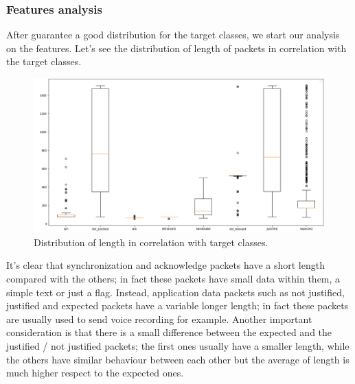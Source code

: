 \documentclass[sigconf]{acmart}
\begin{document}
	\subsubsection{Features analysis}
	After guarantee a good distribution for the target classes, we start our analysis on the features. Let's see the distribution of length of packets in correlation with the target classes.
	\begin{figure}[h!]
            \includegraphics[width=0.8\linewidth]{img/length_distribution.png}
            \caption{Distribution of length in correlation with target classes.}
            \label{fig:length_distribution}
        \end{figure}

	It's clear that synchronization and acknowledge packets have a short length compared with the others; in fact these packets have small data within them, a simple text or just a flag. Instead, application data packets such as not justified, justified and expected packets have a variable longer length; in fact these packets are usually used to send voice recording for example. Another important consideration is that there is a small difference between the expected and the justified / not justified packets; the first ones usually have a smaller length, while the others have similar behaviour between each other but the average of length is much higher respect to the expected ones.
\end{document}
